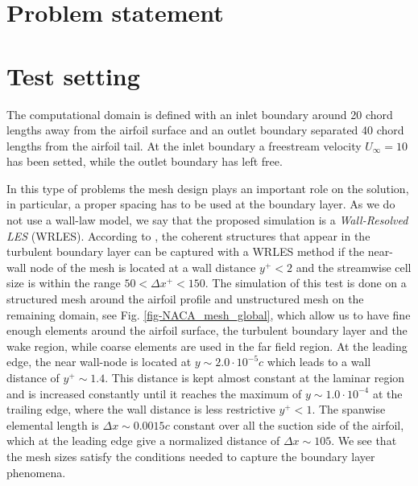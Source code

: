\section{Problem statement}
\label{sec-C8_prob_statement}

\section{Test setting}
\label{sec-C8_setting}
The computational domain is defined with an inlet boundary around 20 chord lengths away from the airfoil surface and an outlet boundary separated 40 chord lengths from the airfoil tail. At the inlet boundary a freestream velocity $U_\infty=10$ has been setted, while the outlet boundary has left free. 

In this type of problems the mesh design plays an important role on the solution, in particular, a proper spacing has to be used at the boundary layer. As we do not use a wall-law model, we say that the proposed simulation is a \textit{Wall-Resolved LES} (WRLES). According to \cite{piomelli_large-eddy_1996}, the coherent structures that appear in the turbulent boundary layer can be captured with a WRLES method if the near-wall node of the mesh is located at a wall distance $y^+<2$ and the streamwise cell size is within the range $50<\Delta x^+<150$. The simulation of this test is done on a structured mesh around the airfoil profile and unstructured mesh on the remaining domain, see Fig. \ref{fig-NACA_mesh_global}, which allow us to have fine enough elements around the airfoil surface, the turbulent boundary layer and the wake region, while coarse elements are used in the far field region. At the leading edge, the near wall-node is located at $y\sim 2.0\cdot10^{-5}c$ which leads to a wall distance of $ y^+\sim1.4$. This distance is kept almost constant at the laminar region and is increased constantly until it reaches the maximum of $y\sim1.0\cdot10^{-4}$ at the trailing edge, where the wall distance is less restrictive $y^+<1$. The spanwise elemental length is $\Delta x\sim0.0015c$ constant over all the suction side of the airfoil, which at the leading edge give a normalized distance of $\Delta x\sim105$. We see that the mesh sizes satisfy the conditions needed to capture the boundary layer phenomena.

